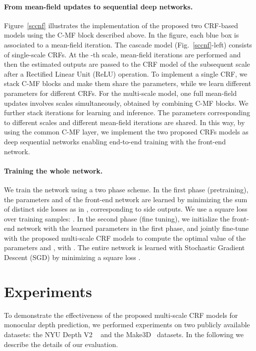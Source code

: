 \documentclass[10pt,twocolumn,letterpaper]{article}
\begin{document}
\paragraph{From mean-field updates to sequential deep networks.}
Figure~\ref{sccnf} illustrates the implementation of the proposed two CRF-based models using the C-MF block described above. 
In the figure, each blue box is associated to a mean-field iteration. 
The cascade model (Fig.~\ref{sccnf}-left) consists of  single-scale CRFs. At the -th scale, 
 mean-field iterations are performed and then the estimated outputs are passed to the CRF model of the 
subsequent scale after a Rectified Linear Unit (ReLU) operation. To implement a single CRF, we stack  C-MF blocks and 
make them share the parameters, while we learn different parameters for different CRFs. For the multi-scale model, one full 
mean-field updates involves  scales simultaneously, obtained by combining  C-MF blocks. We further stack  
iterations for learning and inference. The parameters corresponding to different scales and different 
mean-field iterations are shared. In this way, by using the common C-MF layer, we implement the two proposed CRFs models as 
deep sequential networks enabling end-to-end training with the front-end network.
\vspace{-0.45cm}
\paragraph{Training the whole network.}\label{learning}
We train the network using a two phase scheme. In the first phase (pretraining), the 
parameters  and  
of the front-end network are learned
by minimizing the sum of  distinct side losses as in \cite{xie2015holistically}, corresponding to  side 
outputs. We use a square loss over  training samples: . In the second phase (fine tuning), we initialize the front-end network with the learned parameters in the first phase, and 
jointly fine-tune with the proposed multi-scale CRF models to compute the optimal value of the 
parameters  and , with 
. The entire network is learned with Stochastic Gradient Descent (SGD) 
by minimizing a square loss .  

 
\section{Experiments}
To demonstrate the effectiveness of the proposed multi-scale CRF models for monocular depth prediction,
we performed experiments on two publicly available datasets: 
the NYU Depth V2 ~\cite{silberman2012indoor} and the Make3D~\cite{saxena2005learning} datasets. In the
following we describe the details of our evaluation.
\end{document}
